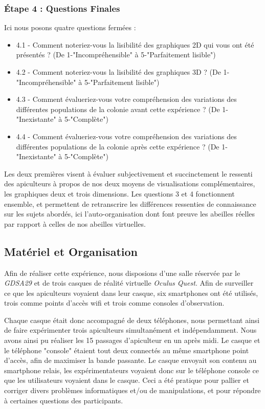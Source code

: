 			\subsubsection{Étape 4 : Questions Finales}
			Ici nous posons quatre questions fermées :
			\begin{itemize}
				\item 4.1 - Comment noteriez-vous la lisibilité des graphiques 2D qui vous ont été présentés ? (De 1-"Incompréhensible" à 5-"Parfaitement lisible")
				\item 4.2 - Comment noteriez-vous la lisibilité des graphiques 3D ? (De 1-"Incompréhensible" à 5-"Parfaitement lisible")
				\item 4.3 - Comment évalueriez-vous votre compréhension des variations des différentes populations de la colonie avant cette expérience ? (De 1-"Inexistante" à 5-"Complète")
				\item 4.4 - Comment évalueriez-vous votre compréhension des variations des différentes populations de la colonie après cette expérience ? (De 1-"Inexistante" à 5-"Complète")
			\end{itemize}
			
			Les deux premières visent à évaluer subjectivement et succinctement le ressenti des apiculteurs à propos de nos deux moyens de visualisations complémentaires, les graphiques deux et trois dimensions.
			Les questions 3 et 4 fonctionnent ensemble, et permettent de retranscrire les différences ressenties de connaissance sur les sujets abordés, ici l'auto-organisation dont font preuve les abeilles réelles par rapport à celles de nos abeilles virtuelles.
		
		
		\subsection{Matériel et Organisation}
		Afin de réaliser cette expérience, nous disposions d'une salle réservée par le \textit{GDSA29} et de trois casques de réalité virtuelle \textit{Oculus Quest}. Afin de surveiller ce que les apiculteurs voyaient dans leur casque, six smartphones ont été utilisés, trois comme points d'accès wifi et trois comme consoles d'observation.
		
		Chaque casque était donc accompagné de deux téléphones, nous permettant ainsi de faire expérimenter trois apiculteurs simultanément et indépendamment. Nous avons ainsi pu réaliser les 15 passages d'apiculteur en un après midi. Le casque et le téléphone "console" étaient tout deux connectés au même smartphone point d'accès, afin de maximiser la bande passante. Le casque envoyait son contenu au smartphone relais, les expérimentateurs voyaient donc sur le téléphone console ce que les utilisateurs voyaient dans le casque. Ceci a été pratique pour pallier et corriger divers problèmes informatiques et/ou de manipulations, et pour répondre à certaines questions des participants.
		
